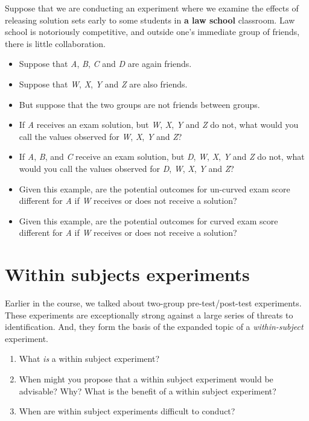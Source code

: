 \documentclass[
]{book}
\providecommand{\tightlist}{%
  \setlength{\itemsep}{0pt}\setlength{\parskip}{0pt}}
\begin{document}
Suppose that we are conducting an experiment where we examine the
effects of releasing solution sets early to some students in \textbf{a
law school} classroom. Law school is notoriously competitive, and
outside one's immediate group of friends, there is little collaboration.

\begin{itemize}
\item
  Suppose that \emph{A}, \emph{B}, \emph{C} and \emph{D} are again
  friends.
\item
  Suppose that \emph{W}, \emph{X}, \emph{Y} and \emph{Z} are also
  friends.
\item
  But suppose that the two groups are not friends between groups.
\item
  If \emph{A} receives an exam solution, but \emph{W}, \emph{X},
  \emph{Y} and \emph{Z} do not, what would you call the values observed
  for \emph{W}, \emph{X}, \emph{Y} and \emph{Z}?
\item
  If \emph{A}, \emph{B}, and \emph{C} receive an exam solution, but
  \emph{D}, \emph{W}, \emph{X}, \emph{Y} and \emph{Z} do not, what would
  you call the values observed for \emph{D}, \emph{W}, \emph{X},
  \emph{Y} and \emph{Z}?
\item
  Given this example, are the potential outcomes for un-curved exam
  score different for \emph{A} if \emph{W} receives or does not receive
  a solution?
\item
  Given this example, are the potential outcomes for curved exam score
  different for \emph{A} if \emph{W} receives or does not receive a
  solution?
\end{itemize}

\hypertarget{within-subjects-experiments}{%
\section{Within subjects
experiments}\label{within-subjects-experiments}}

Earlier in the course, we talked about two-group pre-test/post-test
experiments. These experiments are exceptionally strong against a large
series of threats to identification. And, they form the basis of the
expanded topic of a \emph{within-subject} experiment.

\begin{enumerate}
\def\labelenumi{\arabic{enumi}.}
\tightlist
\item
  What \emph{is} a within subject experiment?
\item
  When might you propose that a within subject experiment would be
  advisable? Why? What is the benefit of a within subject experiment?
\item
  When are within subject experiments difficult to conduct?
\end{enumerate}
\end{document}
